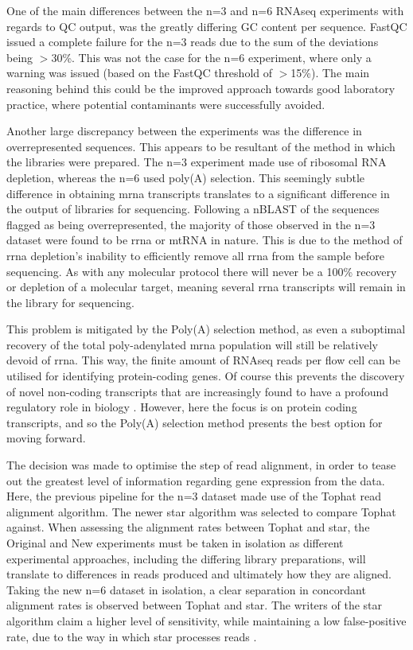 One of the main differences between the n=3 and n=6 RNAseq experiments with regards to QC output, was the greatly differing GC content per sequence. FastQC issued a complete failure for the n=3 reads due to the sum of the deviations being $>$30\%. This was not the case for the n=6 experiment, where only a warning was issued (based on the FastQC threshold of $>$15\%). The main reasoning behind this could be the improved approach towards good laboratory practice, where potential contaminants were successfully avoided.

Another large discrepancy between the experiments was the difference in overrepresented sequences. This appears to be resultant of the method in which the libraries were prepared. The n=3 experiment made use of ribosomal RNA depletion, whereas the n=6 used poly(A) selection. This seemingly subtle difference in obtaining \acrshort{mrna} transcripts translates to a significant difference in the output of libraries for sequencing. Following a nBLAST of the sequences flagged as being overrepresented, the majority of those observed in the n=3 dataset were found to be \acrshort{rrna} or mtRNA in nature. This is due to the method of \acrshort{rrna} depletion's inability to efficiently remove all \acrshort{rrna} from the sample before sequencing. As with any molecular protocol there will never be a 100\% recovery or depletion of a molecular target, meaning several \acrshort{rrna} transcripts will remain in the library for sequencing.

This problem is mitigated by the Poly(A) selection method, as even a suboptimal recovery of the total poly-adenylated \acrshort{mrna} population will still be relatively devoid of \acrshort{rrna}. This way, the finite amount of RNAseq reads per flow cell can be utilised for identifying protein-coding genes. Of course this prevents the discovery of novel non-coding transcripts that are increasingly found to have a profound regulatory role in biology \cite{Hube2018}. However, here the focus is on protein coding transcripts, and so the Poly(A) selection method presents the best option for moving forward.

The decision was made to optimise the step of read alignment, in order to tease out the greatest level of information regarding gene expression from the data. Here, the previous pipeline for the n=3 dataset made use of the Tophat read alignment algorithm. The newer \acrfull{star} algorithm was selected to compare Tophat against. When assessing the alignment rates between Tophat and \acrshort{star}, the Original and New experiments must be taken in isolation as different experimental approaches, including the differing library preparations, will translate to differences in reads produced and ultimately how they are aligned. Taking the new n=6 dataset in isolation, a clear separation in concordant alignment rates is observed between Tophat and \acrshort{star}. The writers of the \acrshort{star} algorithm claim a higher level of sensitivity, while maintaining a low false-positive rate, due to the way in which \acrshort{star} processes reads \cite{Dobin2012}. 

